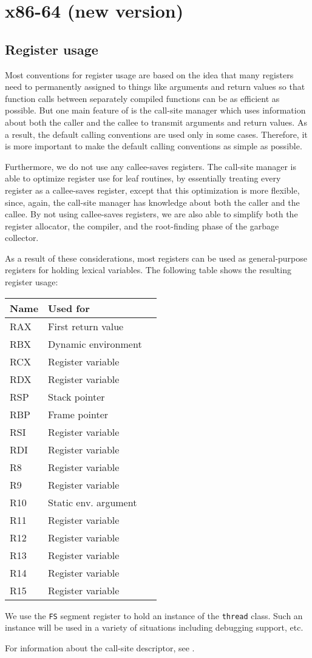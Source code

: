 \chapter{x86-64 (new version)}
\label{chapter-backend-x86-64-new}

\section{Register usage}
\label{sec-backend-x86-64-new-register-use}

Most conventions for register usage are based on the idea that many
registers need to permanently assigned to things like arguments and
return values so that function calls between separately compiled
functions can be as efficient as possible.  But one main feature of
\sysname{} is the call-site manager which uses information about both
the caller and the callee to transmit arguments and return values.  As
a result, the default calling conventions are used only in some
cases.  Therefore, it is more important to make the default calling
conventions as simple as possible.

Furthermore, we do not use any callee-saves registers.  The call-site
manager is able to optimize register use for leaf routines, by
essentially treating every register as a callee-saves register, except
that this optimization is more flexible, since, again, the call-site
manager has knowledge about both the caller and the callee.  By not
using callee-saves registers, we are also able to simplify both the
register allocator, the compiler, and the root-finding phase of the
garbage collector.

As a result of these considerations, most registers can be used as
general-purpose registers for holding lexical variables.  The
following table shows the resulting register usage:

\begin{tabular}{|l|l|l|}
\hline
Name & Used for\\
\hline
\hline
RAX & First return value\\
RBX & Dynamic environment\\
RCX & Register variable\\
RDX & Register variable\\
RSP & Stack pointer \\
RBP & Frame pointer \\
RSI & Register variable\\
RDI & Register variable\\
R8  & Register variable\\
R9  & Register variable\\
R10 & Static env. argument\\
R11 & Register variable\\
R12 & Register variable\\
R13 & Register variable\\
R14 & Register variable\\
R15 & Register variable\\
\hline
\end{tabular}

We use the \texttt{FS} segment register to hold an instance of the
\texttt{thread} class.  Such an instance will be used in a variety of
situations including debugging support, etc.

For information about the call-site descriptor, see
.

